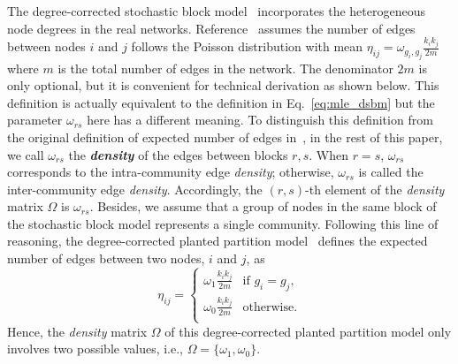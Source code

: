 The degree-corrected stochastic block model~\cite{karrer2011stochastic,newman2016equivalence} incorporates the heterogeneous node degrees in the real networks. Reference~\cite{newman2016equivalence} assumes the number of edges between nodes $i$ and $j$ follows the Poisson distribution with mean $\eta_{ij} = \omega_{g_i,g_j} \frac{k_i k_j}{2m}$ where $m$ is the total number of edges in the network. The denominator $2m$ is only optional, but it is convenient for technical derivation as shown below. This definition is actually equivalent to the definition in Eq.~\ref{eq:mle_dsbm} but the parameter $\omega_{rs}$ here has a different meaning. To distinguish this definition from the original definition of expected number of edges in~\cite{karrer2011stochastic}, in the rest of this paper, we call $\omega_{rs}$ the \textit{{\bf \it density}} of the edges between blocks $r,s$. When $r=s$, $\omega_{rs}$ corresponds to the intra-community edge {\it density}; otherwise, $\omega_{rs}$ is called the inter-community edge {\it density}. Accordingly, the $(r, s)$-th element of the {\it density} matrix $\Omega$ is $\omega_{rs}$. Besides, we assume that a group of nodes in the same block of the stochastic block model represents a single community. Following this line of reasoning, the degree-corrected planted partition model~\cite{newman2016equivalence} defines the expected number of edges between two nodes, $i$ and $j$, as   
\begin{equation} \label{eq:pp}
\eta_{ij} = 
    \begin{cases}
         \omega_{1} \frac{k_i k_j}{2m}    & \text{if  } g_i = g_j,  \\
         \omega_{0} \frac{k_i k_j}{2m}  & \text{otherwise}. \\
    \end{cases}
\end{equation}
Hence, the {\it density} matrix $\Omega$ of this degree-corrected planted partition model only involves two possible values, i.e., $\Omega=\{\omega_{1}, \omega_{0}\}$.

